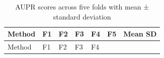 \documentclass{article}
\begin{document}
\begin{longtable}[]{@{}
  >{\raggedright\arraybackslash}p{}
  >{\raggedleft\arraybackslash}p{}
  >{\raggedleft\arraybackslash}p{}
  >{\raggedleft\arraybackslash}p{}
  >{\raggedleft\arraybackslash}p{}
  >{\raggedleft\arraybackslash}p{}
  >{\raggedright\arraybackslash}p{}@{}}
\caption{AUPR scores across five folds with mean ± standard
deviation}\tabularnewline
\toprule\noalign{}
\begin{minipage}[b]{\linewidth}\raggedright
Method
\end{minipage} & \begin{minipage}[b]{\linewidth}\raggedleft
F1
\end{minipage} & \begin{minipage}[b]{\linewidth}\raggedleft
F2
\end{minipage} & \begin{minipage}[b]{\linewidth}\raggedleft
F3
\end{minipage} & \begin{minipage}[b]{\linewidth}\raggedleft
F4
\end{minipage} & \begin{minipage}[b]{\linewidth}\raggedleft
F5
\end{minipage} & \begin{minipage}[b]{\linewidth}\raggedright
Mean SD
\end{minipage} \\
\midrule\noalign{}
\endfirsthead
\toprule\noalign{}
\begin{minipage}[b]{\linewidth}\raggedright
Method
\end{minipage} & \begin{minipage}[b]{\linewidth}\raggedleft
F1
\end{minipage} & \begin{minipage}[b]{\linewidth}\raggedleft
F2
\end{minipage} & \begin{minipage}[b]{\linewidth}\raggedleft
F3
\end{minipage} & \begin{minipage}[b]{\linewidth}\raggedleft
F4
\end{minipage} & \begin{minipage}[b]{\linewidth}\raggedleft

\end{minipage}
\end{longtable}
\end{document}
